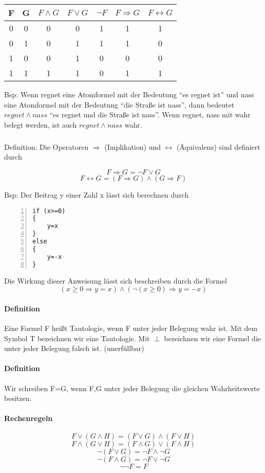 \documentclass[a4paper]{scrartcl}
\begin{document}
\begin{tabular}{c|c|c|c|c|c|c}

F & G & $F \wedge G$ &$ F \vee G$&$\neg F$ & $F \Rightarrow G$ & $F \leftrightarrow G$ \\ \hline
0&0&0&0&1&1&1 \\
0&1&0&1&1&1&0 \\
1&0&0&1&0&0&0 \\
1&1&1&1&0 &1&1\\

\end{tabular}

Bsp: Wenn regnet eine Atomformel mit der Bedeutung "`es regnet ist"' und nass eine Atomformel mit der Bedeutung "`die Straße ist nass"', dann bedeutet $regnet \wedge nass$  "`es regnet und die Straße ist nass"'.
Wenn regnet, nass mit wahr belegt werden, ist auch $regnet \wedge nass$ wahr.
\subparagraph{}
Definition: Die Operatoren $\Rightarrow$ (Implikation) und $\leftrightarrow$ (Äquivalenz) sind definiert durch

\[F \Rightarrow G = \neg F \vee G\]
\[F \leftrightarrow G = ( F \Rightarrow G ) \wedge ( G \Rightarrow F)\]

Bsp: Der Beitrag y einer Zahl x lässt sich berechnen durch

\begin{lstlisting}[numbers=left, tabsize=4, style=customc]
if (x>=0)
{
	y=x
}
else
{
	y=-x
}
\end{lstlisting}

Die Wirkung dieser Anweisung lässt sich beschreiben durch die Formel
\[(x\geq 0 \Rightarrow y = x) \wedge (\neg (x\geq 0)\Rightarrow y=-x)\]

\paragraph{Definition}
Eine Formel F heißt Tautologie, wenn F unter jeder Belegung wahr ist. Mit dem Symbol T bezeichnen wir eine Tautologie.
Mit $\perp$ bezeichnen wir eine Formel die unter jeder Belegung falsch ist. (unerfüllbar)
\paragraph{Definition}
Wir schreiben F=G, wenn F,G unter jeder Belegung die gleichen Wahrheitswerte besitzen.
\paragraph{Rechenregeln}
\[F\vee (G\wedge H)= (F\vee G)\wedge(F\vee H)\]
\[F\wedge (G\vee H) = (F\wedge G)\vee (F\wedge H)\]
\[\neg (F\vee G) = \neg F \wedge \neg G\]
\[\neg (F \wedge G) = \neg F \vee \neg G\]
\[\neg \neg F = F\]
\end{document}
